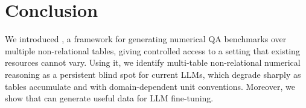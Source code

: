 \section{Conclusion}



We introduced \name, a framework for generating numerical QA benchmarks over multiple non-relational tables, giving controlled access to a setting that existing resources cannot vary. Using it, we identify multi-table non-relational numerical reasoning as a persistent blind spot for current LLMs, which degrade sharply as tables accumulate and with domain-dependent unit conventions. Moreover, we show that \name can generate useful data for LLM fine-tuning.
